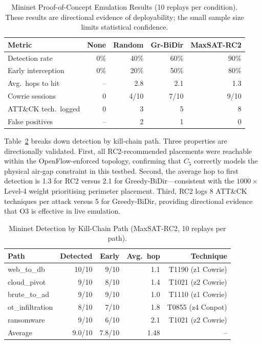 \documentclass[journal]{IEEEtran}
\begin{document}
\begin{table}[t]
\caption{Mininet Proof-of-Concept Emulation Results
  (10 replays per condition). These results are directional evidence
  of deployability; the small sample size limits statistical
  confidence.}
\label{tab:emulation}
\centering
\renewcommand{\arraystretch}{1.2}
\begin{tabular}{lrrrr}
\toprule
Metric & None & Random & Gr-BiDir & MaxSAT-RC2 \\
\midrule
Detection rate     & 0\%  & 40\%   & 60\%   & 90\% \\
Early interception & 0\%  & 20\%   & 50\%   & 80\% \\
Avg.\ hops to hit  & --   & 2.8    & 2.1    & 1.3  \\
Cowrie sessions    & 0    & 4/10   & 7/10   & 9/10 \\
ATT\&CK tech.\ logged & 0 & 3      & 5      & 8    \\
False positives    & --   & 2      & 1      & 0    \\
\bottomrule
\end{tabular}
\end{table}

Table~\ref{tab:emulation_paths} breaks down detection by kill-chain
path. Three properties are directionally validated. First, all
RC2-recommended placements were reachable within the
OpenFlow-enforced topology, confirming that $C_5$ correctly models
the physical air-gap constraint in this testbed. Second, the average
hop to first detection is 1.3 for RC2 versus 2.1 for
Greedy-BiDir---consistent with the $1000\times$ Level-4 weight
prioritising perimeter placement. Third, RC2 logs 8 ATT\&CK
techniques per attack versus 5 for Greedy-BiDir, providing
directional evidence that O3 is effective in live emulation.

\begin{table}[t]
\caption{Mininet Detection by Kill-Chain Path (MaxSAT-RC2,
  10 replays per path).}
\label{tab:emulation_paths}
\centering
\renewcommand{\arraystretch}{1.2}
\begin{tabular}{lrrrr}
\toprule
Path & Detected & Early & Avg.\ hop & Technique \\
\midrule
web\_to\_db      & 10/10 & 9/10 & 1.1 & T1190 (z1 Cowrie) \\
cloud\_pivot     & 9/10  & 8/10 & 1.4 & T1021 (z2 Cowrie) \\
brute\_to\_ad    & 9/10  & 9/10 & 1.0 & T1110 (z1 Cowrie) \\
ot\_infiltration & 8/10  & 7/10 & 1.8 & T0855 (z4 Conpot) \\
ransomware       & 9/10  & 6/10 & 2.1 & T1021 (z2 Cowrie) \\
\midrule
Average & 9.0/10 & 7.8/10 & 1.48 & -- \\
\bottomrule
\end{tabular}
\end{table}
\end{document}
